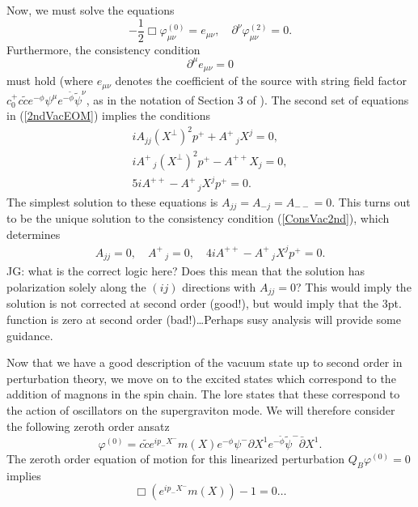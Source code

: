 \documentclass[12pt]{article}
\numberwithin{equation}{section}
\newcommand{\WT}[1]{\widetilde{#1}}
\newcommand{\B}[1]{\bar{#1}}
\begin{document}
Now, we must solve the equations
\begin{equation} \label{2ndVacEOM}
    -\frac{1}{2}\Box\varphi_{\mu\nu}^{(0)}=e_{\mu\nu},\quad \partial^{\nu}\varphi_{\mu\nu}^{(2)}=0.
\end{equation}
Furthermore, the consistency condition
\begin{equation} \label{ConsVac2nd}
    \partial^{\mu}e_{\mu\nu}=0
\end{equation}
must hold (where $e_{\mu\nu}$ denotes the coefficient of the source with string field factor $c_0^+c\WT{c}e^{-\phi}\psi^{\mu}e^{-\WT{\phi}}\WT{\psi}^{\nu}$, as in the notation of Section 3 of \cite{Cho:2025coy}). The second set of equations in (\ref{2ndVacEOM}) implies the conditions
\begin{gather}
    i A_{jj}(X^{\perp})^2p^+ + A^+\,_{j}X^j = 0,\\
    iA^+\,_j(X^{\perp})^2p^+-A^{++}X_j = 0,\\
    5iA^{++}-A^+\,_jX^jp^+ = 0.
\end{gather}
The simplest solution to these equations is $A_{jj}=A_{-j}=A_{--}=0$. This turns out to be the unique solution to the consistency condition (\ref{ConsVac2nd}), which determines
\begin{gather}
    A_{jj}=0,\quad A^+\,_{j}=0,\quad 4iA^{++}-A^+\,_jX^jp^+=0.
\end{gather}
\textcolor{scpurple}{JG: what is the correct logic here? Does this mean that the solution has polarization solely along the $(ij)$ directions with $A_{jj}=0$? This would imply the solution is not corrected at second order (good!), but would imply that the 3pt. function is zero at second order (bad!)\dots Perhaps susy analysis will provide some guidance.}


Now that we have a good description of the vacuum state up to second order in perturbation theory, we move on to the excited states which correspond to the addition of magnons in the spin chain. The lore \cite{Berenstein:2002jq} states that these correspond to the action of oscillators on the supergraviton mode. We will therefore consider the following zeroth order ansatz
\begin{equation}
    \varphi^{(0)}=c\WT{c}e^{ip_-X^-}m(X)e^{-\phi}\psi^-\partial X^1e^{-\WT{\phi}}\WT{\psi}^-\B{\partial}X^1.
\end{equation}
The zeroth order equation of motion for this linearized perturbation $Q_B\varphi^{(0)}=0$ implies
\begin{equation}
    \Box\left(e^{ip_-X^-}m(X)\right)-1=0\ldots
\end{equation}
\end{document}
